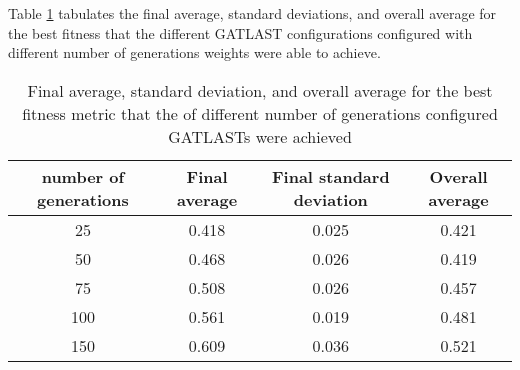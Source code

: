 Table \ref{tab:HP:GA:numGenerations:best fitness} tabulates the final average, standard deviations, and overall average for the best fitness that the different GATLAST configurations configured with different number of generations weights were able to achieve.
\begin{table}[tbh!]
\centering
\begin{adjustbox}{trim=0cm 0cm 0cm 0cm, clip=true}
\begin{tabular}{|c|c|c|c|}
\hline
number of generations & Final average & Final standard deviation & Overall average\\
\hline
25 & 0.418 & 0.025 & 0.421\\\hline
50 & 0.468 & 0.026 & 0.419\\\hline
75 & 0.508 & 0.026 & 0.457\\\hline
100 & 0.561 & 0.019 & 0.481\\\hline
150 & 0.609 & 0.036 & 0.521\\\hline
\end{tabular}
\end{adjustbox}
\caption{Final average, standard deviation, and overall average for the best fitness metric that the of different number of generations configured GATLASTs were achieved}
\label{tab:HP:GA:numGenerations:best fitness}
\end{table}